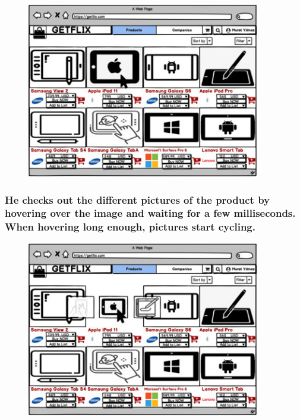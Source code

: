 \documentclass[]{article}
\begin{document}
\begin{figure}[H]
    \centering
    \includegraphics[height=3in]{./images/47.jpg}
\end{figure}

\hypertarget{he-checks-out-the-different-pictures-of-the-product-by-hovering-over-the-image-and-waiting-for-a-few-milliseconds.-when-hovering-long-enough-pictures-start-cycling.}{%
    \subsubsection{He checks out the different pictures of the product by
        hovering over the image and waiting for a few milliseconds. When
        hovering long enough, pictures start
        cycling.}\label{he-checks-out-the-different-pictures-of-the-product-by-hovering-over-the-image-and-waiting-for-a-few-milliseconds.-when-hovering-long-enough-pictures-start-cycling.}}

\begin{figure}[H]
    \centering
    \includegraphics[height=3in]{./images/48.jpg}
\end{figure}
\end{document}
